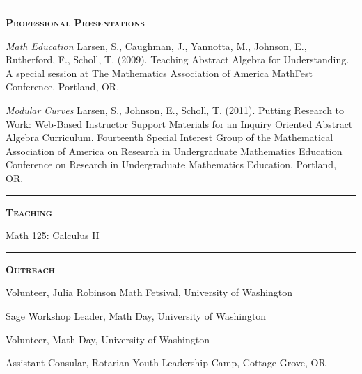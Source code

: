\documentclass[12pt]{article}
\newcommand{\sectionheading}[1]
{
\bigskip %
\noindent
\hspace{-6.5mm}\textcolor{Gray}{\rule[.75mm]{21.5mm}{1mm}} %
\hspace{.2mm}	%
{\large{\textbf{\textsc{#1}}}} %
}
\newenvironment{date_section}
	{
	\vspace{-1ex}
	\leftmargini = 15ex
		\begin{itemize}[
			labelsep = *,
			labelwidth = 9ex,
			labelindent = 0ex,
			itemindent = !,
			font=\normalfont,
			align=parleft
		]{}
		\itemsep=-1.5mm
	}
	{\end{itemize}\vspace{-2ex}}
\newcommand{\yearmo}[2]{
	\item[
		{\makebox[1ex][r]{#1}}
		\hspace{1ex}
		{\makebox[1ex][l]{#2} }
		] }
\begin{document}
	\sectionheading{Professional Presentations}%

		\begin{date_section}


			\yearmo{2009}{} %
			\emph{Math Education}
				Larsen, S., Caughman, J., Yannotta, M.,
				Johnson, E., Rutherford, F., Scholl, T.
				(2009). Teaching Abstract Algebra for
				Understanding. A special session at The
				Mathematics Association of America MathFest
				Conference. Portland, OR.

			\yearmo{2011}{} %
			\emph{Modular Curves}
				Larsen, S., Johnson, E., Scholl, T. (2011).
				Putting Research to Work: Web-Based Instructor
				Support Materials for an Inquiry Oriented
				Abstract Algebra Curriculum. Fourteenth Special
				Interest Group of the Mathematical Association
				of America on Research in Undergraduate
				Mathematics Education Conference on Research
				in Undergraduate Mathematics Education.
				Portland, OR.

		\end{date_section}

	\sectionheading{Teaching}%

		\begin{date_section}

			\yearmo{}{2014}%
				Math 125: Calculus II

		\end{date_section}

	\sectionheading{Outreach}%

			\begin{date_section}

				\yearmo{}{2015}
					Volunteer,
					Julia Robinson Math Fetsival,
					University of Washington

				\yearmo{}{2015}
					Sage Workshop Leader,
					Math Day,
					University of Washington

				\yearmo{}{2014}
					Volunteer,
					Math Day,
					University of Washington

				\yearmo{}{2010}
					Assistant Consular,
					Rotarian Youth Leadership Camp,
					Cottage Grove, OR

			\end{date_section}


\end{document}
